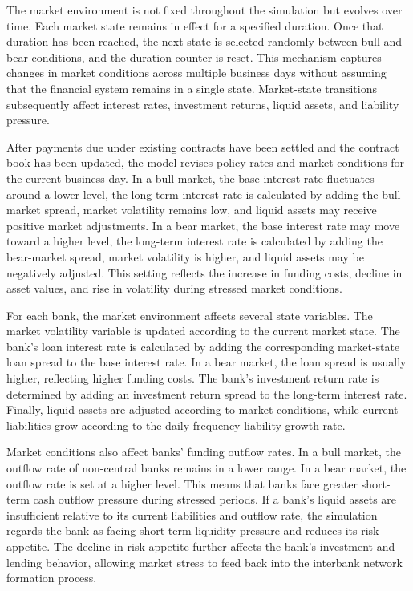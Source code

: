 The market environment is not fixed throughout the simulation but
evolves over time. Each market state remains in effect for a specified
duration. Once that duration has been reached, the next state is
selected randomly between bull and bear conditions, and the duration
counter is reset. This mechanism captures changes in market conditions
across multiple business days without assuming that the financial system
remains in a single state. Market-state transitions subsequently affect
interest rates, investment returns, liquid assets, and liability
pressure.

After payments due under existing contracts have been settled and the
contract book has been updated, the model revises policy rates and
market conditions for the current business day. In a bull market, the
base interest rate fluctuates around a lower level, the long-term
interest rate is calculated by adding the bull-market spread, market
volatility remains low, and liquid assets may receive positive market
adjustments. In a bear market, the base interest rate may move toward a
higher level, the long-term interest rate is calculated by adding the
bear-market spread, market volatility is higher, and liquid assets may
be negatively adjusted. This setting reflects the increase in funding
costs, decline in asset values, and rise in volatility during stressed
market conditions.

For each bank, the market environment affects several state variables.
The market volatility variable is updated according to the current
market state. The bank's loan interest rate is calculated by adding the
corresponding market-state loan spread to the base interest rate. In a
bear market, the loan spread is usually higher, reflecting higher
funding costs. The bank's investment return rate is determined by adding
an investment return spread to the long-term interest rate. Finally,
liquid assets are adjusted according to market conditions, while current
liabilities grow according to the daily-frequency liability growth rate.

Market conditions also affect banks' funding outflow rates. In a bull
market, the outflow rate of non-central banks remains in a lower range.
In a bear market, the outflow rate is set at a higher level. This means
that banks face greater short-term cash outflow pressure during stressed
periods. If a bank's liquid assets are insufficient relative to its
current liabilities and outflow rate, the simulation regards the bank as
facing short-term liquidity pressure and reduces its risk appetite. The
decline in risk appetite further affects the bank's investment and
lending behavior, allowing market stress to feed back into the interbank
network formation process.

